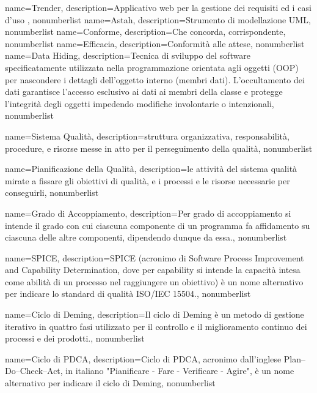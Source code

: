 {
	name={Trender},
	description={Applicativo web per la gestione dei requisiti ed i casi d'uso },
	nonumberlist
}
{
	name={Astah},
	description={Strumento di modellazione UML},
	nonumberlist
}
{
	name={Conforme},
	description={Che concorda, corrispondente},
	nonumberlist
}
{
	name={Efficacia},
	description={Conformità alle attese},
	nonumberlist
}
{
	name={Data Hiding},
	description={Tecnica di sviluppo del software specificatamente utilizzata nella programmazione orientata agli oggetti (OOP) per nascondere i dettagli dell'oggetto interno (membri dati). L'occultamento dei dati garantisce l'accesso esclusivo ai dati ai membri della classe e protegge l'integrità degli oggetti impedendo modifiche involontarie o intenzionali},
	nonumberlist
}

{
	name={Sistema Qualità},
	description={struttura organizzativa, responsabilità, procedure, e risorse messe in atto per il perseguimento della qualità},
	nonumberlist 
}

{
	name={Pianificazione della Qualità},
	description={le attività del sistema qualità mirate a fissare gli obiettivi di qualità, e i processi e le risorse necessarie per conseguirli},
	nonumberlist 
}

{
	name={Grado di Accoppiamento},
	description={Per grado di accoppiamento si intende il grado con cui ciascuna componente di un programma fa affidamento su ciascuna delle altre componenti, dipendendo dunque da essa.},
	nonumberlist 
}

{
	name={SPICE},
	description={SPICE (acronimo di Software Process Improvement and Capability Determination, dove per capability si intende la capacità intesa come abilità di un processo nel raggiungere un obiettivo) è un nome alternativo per indicare lo standard di qualità ISO/IEC 15504.}, 
	nonumberlist 
}

{
	name={Ciclo di Deming},
	description={Il ciclo di Deming è un metodo di gestione iterativo in quattro fasi utilizzato per il controllo e il miglioramento continuo dei processi e dei prodotti.}, 
	nonumberlist 
}

{
	name={Ciclo di PDCA},
	description={Ciclo di PDCA, acronimo dall'inglese Plan–Do–Check–Act, in italiano "Pianificare - Fare - Verificare - Agire", è un nome alternativo per indicare il ciclo di Deming}, 
	nonumberlist 
}

